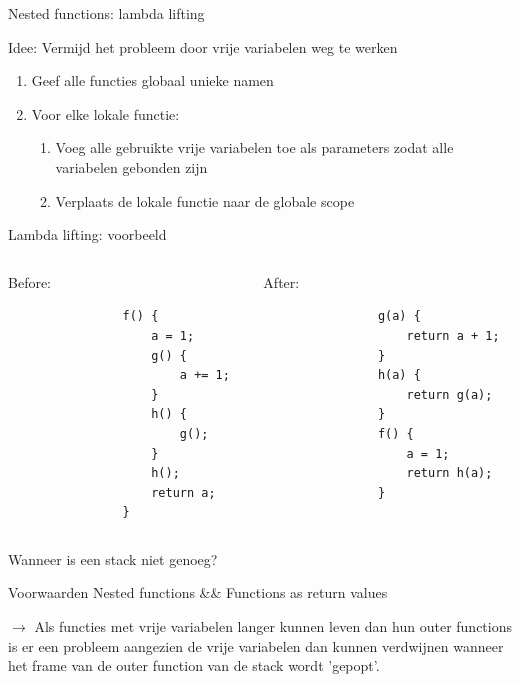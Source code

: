 \documentclass{beamer}
\begin{document}
\begin{frame}{Nested functions: lambda lifting}
	\begin{block}{Idee:}
		Vermijd het probleem door vrije variabelen weg te werken
	\end{block}

	\begin{enumerate}
		\item Geef alle functies globaal unieke namen
		\item Voor elke lokale functie:
		\begin{enumerate}
			\item Voeg alle gebruikte vrije variabelen toe als parameters zodat alle variabelen gebonden zijn
			\item Verplaats de lokale functie naar de globale scope
		\end{enumerate}
	\end{enumerate}

\end{frame}

\begin{frame}[fragile]{Lambda lifting: voorbeeld}
	\begin{columns}[t]
		\begin{column}{.5\textwidth}
			Before:
			\begin{verbatim}
				f() {
				    a = 1;
				    g() {
				        a += 1;
				    }
				    h() {
				        g();
				    }
				    h();
				    return a;
				}
			\end{verbatim}
		\end{column}
		\begin{column}{.5\textwidth}
			After:
			\begin{verbatim}
				g(a) {
				    return a + 1;
				}
				h(a) {
				    return g(a);
				}
				f() {
				    a = 1;
				    return h(a);
				}
			\end{verbatim}
		\end{column}
	\end{columns}
\end{frame}

\begin{frame}{Wanneer is een stack niet genoeg?}
	\begin{block}{Voorwaarden}
		Nested functions \&\& Functions as return values
	\end{block}
	$\rightarrow$ Als functies met vrije variabelen langer kunnen leven dan hun outer functions is er een probleem aangezien de vrije variabelen dan kunnen verdwijnen wanneer het frame van de outer function van de stack wordt 'gepopt'.
\end{frame}
\end{document}
